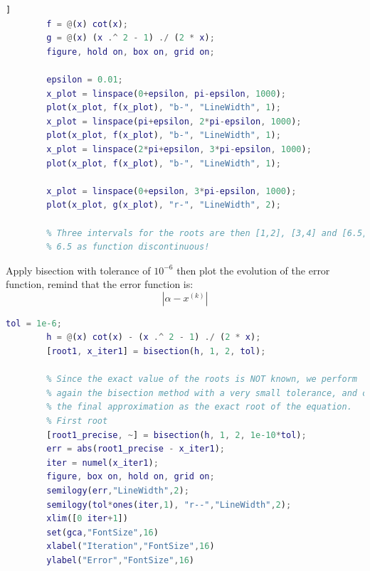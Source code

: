         \begin{lstlisting}[language=Matlab, escapeinside=`', gobble=8]]
        f = @(x) cot(x);
        g = @(x) (x .^ 2 - 1) ./ (2 * x);
        figure, hold on, box on, grid on;

        epsilon = 0.01;
        x_plot = linspace(0+epsilon, pi-epsilon, 1000);
        plot(x_plot, f(x_plot), "b-", "LineWidth", 1);
        x_plot = linspace(pi+epsilon, 2*pi-epsilon, 1000);
        plot(x_plot, f(x_plot), "b-", "LineWidth", 1);
        x_plot = linspace(2*pi+epsilon, 3*pi-epsilon, 1000);
        plot(x_plot, f(x_plot), "b-", "LineWidth", 1);

        x_plot = linspace(0+epsilon, 3*pi-epsilon, 1000);
        plot(x_plot, g(x_plot), "r-", "LineWidth", 2);

        % Three intervals for the roots are then [1,2], [3,4] and [6.5,7]
        % 6.5 as function discontinuous!
        \end{lstlisting}

        Apply bisection with tolerance of $10^{-6}$ then plot the evolution of the error function, remind that the error function is:
        $$
        |\alpha-x^{(k)}|
        $$
        \begin{lstlisting}[language=Matlab, escapeinside=`', gobble=8]
        tol = 1e-6;
        h = @(x) cot(x) - (x .^ 2 - 1) ./ (2 * x);
        [root1, x_iter1] = bisection(h, 1, 2, tol);

        % Since the exact value of the roots is NOT known, we perform
        % again the bisection method with a very small tolerance, and consider
        % the final approximation as the exact root of the equation.
        % First root
        [root1_precise, ~] = bisection(h, 1, 2, 1e-10*tol);
        err = abs(root1_precise - x_iter1);
        iter = numel(x_iter1);
        figure, box on, hold on, grid on;
        semilogy(err,"LineWidth",2);
        semilogy(tol*ones(iter,1), "r--","LineWidth",2);
        xlim([0 iter+1])
        set(gca,"FontSize",16)
        xlabel("Iteration","FontSize",16)
        ylabel("Error","FontSize",16)
        \end{lstlisting}

